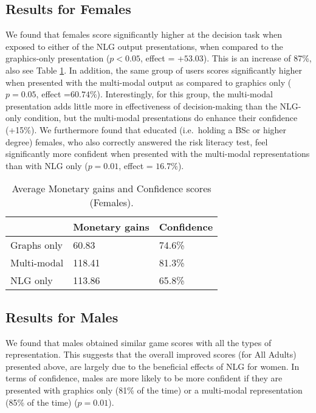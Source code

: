 \documentclass[11pt]{article}
\begin{document}
\subsection{Results for Females} We found that females score significantly higher at the decision task  when exposed to either of the NLG output presentations, when compared to the graphics-only presentation ($p < 0.05$, effect = +$53.03$). This is an increase  of 87\%, also see Table \ref{tab:female}. 
In addition, the same group of users scores significantly higher when presented with the multi-modal output as compared to graphics only ($p = 0.05$, effect =$ 60.74\%$). Interestingly, for this group, the multi-modal presentation adds little more in effectiveness of decision-making than the NLG-only condition, but the multi-modal presentations do enhance their confidence (+15\%).
We furthermore found that educated (i.e.\ holding a BSc or higher degree) females, who also correctly answered the risk literacy test, feel significantly more confident  when presented with the multi-modal representations than with NLG only ($p = 0.01$, effect = $16.7\%$). 

\begin{table}
\small
\centering
\begin{tabular}{|p{2.5cm}|l|p{2cm}|}
\hline   & \bf Monetary gains & \bf Confidence  \\ \hline \hline
Graphs only & 60.83 & 74.6\% \\
Multi-modal & 118.41& 81.3\%\\
NLG only &113.86 & 65.8\%\\
\hline
\end{tabular}
\caption{\label{tab:female} Average Monetary gains and Confidence scores (Females).}
\end{table}

\subsection{Results for Males} We found that males obtained similar game scores
with all the types of representation. 
This suggests that the overall improved scores (for All Adults) presented above, are largely due to the beneficial  effects of NLG for women. 
In terms of confidence, males are more likely to be more confident if they are presented with graphics only (81\% of the time) or a multi-modal representation (85\% of the time) ($p = 0.01$). 
\end{document}

